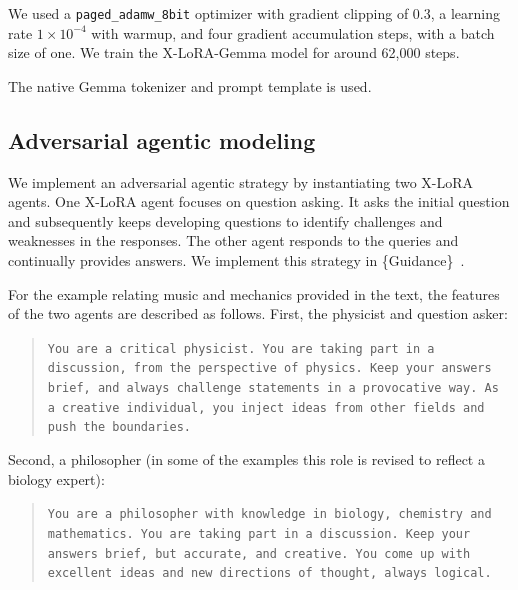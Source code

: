 We used a \texttt{paged\_adamw\_8bit} optimizer with gradient clipping of 0.3, a learning rate $1\times 10^{-4}$ with warmup, and four gradient accumulation steps, with a batch size of one. We train the X-LoRA-Gemma model for around 62,000 steps. 

The native Gemma tokenizer and prompt template is used. 



\subsection{Adversarial agentic modeling}
We implement an adversarial agentic strategy by instantiating two X-LoRA agents. One X-LoRA agent focuses on question asking. It asks the initial question and subsequently keeps developing questions to identify challenges and weaknesses in the responses. The other agent responds to the queries and continually provides answers. We implement this strategy in \{Guidance\}~\cite{Guidance-ai/guidance:Models.}.

For the example relating music and mechanics provided in the text, the features of the two agents are described as follows. First, the physicist and question asker:
\begin{quote}
\small\texttt{You are a critical physicist. You are taking part in a discussion, from the perspective of physics.
Keep your answers brief, and always challenge statements in a provocative way.
\newline\newline
As a creative individual, you inject ideas from other fields and push the boundaries.}
\end{quote}

Second, a philosopher (in some of the examples this role is revised to reflect a biology expert):
\begin{quote}
\small\texttt{You are a philosopher with knowledge in biology, chemistry and mathematics. 
You are taking part in a discussion.
\newline\newline
Keep your answers brief, but accurate, and creative. You come up with excellent ideas and new directions of thought, always logical.}
\end{quote}

